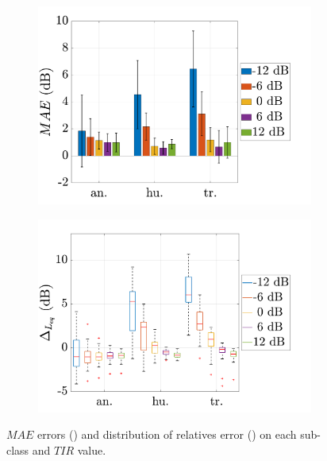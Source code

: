 \documentclass[12pt,english,twoside]{article}
\begin{document}
\begin{figure}
\centering
\begin{subfigure}{.5\textwidth}
  \centering
  \includegraphics[width=.9\linewidth]{figures/mae_ambiance_bar_ICSV.pdf}
  \caption{ }
  \label{fig:bar_mae}
\end{subfigure}%
\begin{subfigure}{.5\textwidth}
  \centering
  \includegraphics[width=.9\linewidth]{figures/boxplot_amb_nmf_thresholded.pdf}
  \caption{}
  \label{fig:boxplot}
\end{subfigure}
\caption{$MAE$ errors () and distribution of relatives error () on each sub-class and $TIR$ value.}
\label{fig:resultat_mae}
\end{figure}
\end{document}

